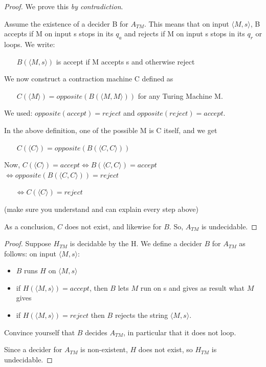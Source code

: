 \begin{proof}
We prove this {\em by contradiction}.


Assume the existence of a decider B for $A_{TM}$. This means that on
input $\langle M,s \rangle$, B accepts if M on input s stops in its
$q_a$ and rejects if M on input s stops in its $q_r$ or loops. We
write:

$~~~~~~~~B(\langle M,s \rangle)$ is accept if M accepts s and otherwise reject

We now construct a contraction machine C defined as

$~~~~~~~~C(\langle M \rangle) = opposite(B(\langle M,M \rangle))$ for
any Turing Machine M.

We used: 
$opposite(accept) = reject$ and $opposite(reject) = accept$.


In the above definition, one of the possible M is C itself, and we get


$~~~~~~~~C(\langle C \rangle) = opposite(B(\langle C,C \rangle))$


Now,  $C(\langle C \rangle) = accept \Leftrightarrow B(\langle C,C \rangle)
= accept$
% 
$ \Leftrightarrow opposite(B(\langle C,C \rangle)) = reject$

$~~~~~~~ \Leftrightarrow C(\langle C \rangle) = reject$ 

(make sure you understand and can explain every step above)

As a conclusion, $C$ does not exist, and likewise for $B$. So,
$A_{TM}$ is undecidable.
\end{proof}

\newpage
\begin{proof}
Suppose $H_{TM}$ is decidable by the H. We define a decider $B$ for
$A_{TM}$ as follows: on input $\langle M,s \rangle$:
\begin{itemize}
\item $B$ runs $H$ on $\langle M,s \rangle$
\item if $H(\langle M,s \rangle) = accept$, then $B$ lets $M$ run on s
  and gives as result what $M$ gives
\item if $H(\langle M,s \rangle) = reject$ then $B$ rejects the string
  $\langle M,s \rangle$.
\end{itemize}
Convince yourself that $B$ decides $A_{TM}$, in particular that it
does not loop.

Since a decider for $A_{TM}$ is non-existent, $H$ does not exist, so
$H_{TM}$ is undecidable.
\end{proof}

